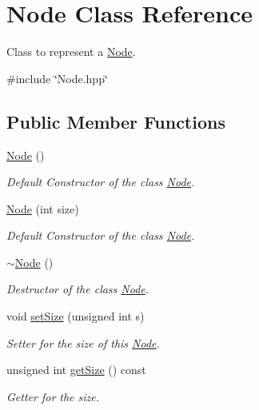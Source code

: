 \hypertarget{classNode}{\section{\-Node \-Class \-Reference}
\label{classNode}
}


\-Class to represent a {\ttfamily \hyperlink{classNode}{\-Node}}.  




{\ttfamily \#include \char`\"{}\-Node.\-hpp\char`\"{}}

\subsection*{\-Public \-Member \-Functions}
\begin{DoxyCompactItemize}
\item 
\hyperlink{classNode_ad7a34779cad45d997bfd6d3d8043c75f}{\-Node} ()
\begin{DoxyCompactList}\small\item\em \-Default \-Constructor of the class {\ttfamily \hyperlink{classNode}{\-Node}}. \end{DoxyCompactList}\item 
\hyperlink{classNode_af221820e3eb858d5db176a80f7f2b295}{\-Node} (int size)
\begin{DoxyCompactList}\small\item\em \-Default \-Constructor of the class {\ttfamily \hyperlink{classNode}{\-Node}}. \end{DoxyCompactList}\item 
\hyperlink{classNode_aa0840c3cb5c7159be6d992adecd2097c}{$\sim$\-Node} ()
\begin{DoxyCompactList}\small\item\em \-Destructor of the class {\ttfamily \hyperlink{classNode}{\-Node}}. \end{DoxyCompactList}\item 
void \hyperlink{classNode_a14102461757715d9046deb90d90ca953}{set\-Size} (unsigned int s)
\begin{DoxyCompactList}\small\item\em \-Setter for the size of this {\ttfamily \hyperlink{classNode}{\-Node}}. \end{DoxyCompactList}\item 
unsigned int \hyperlink{classNode_a9100c7f4f504a06a23f9d9f3c57d88c4}{get\-Size} () const 
\begin{DoxyCompactList}\small\item\em \-Getter for the size. \end{DoxyCompactList}\item 

\end{DoxyCompactItemize}
